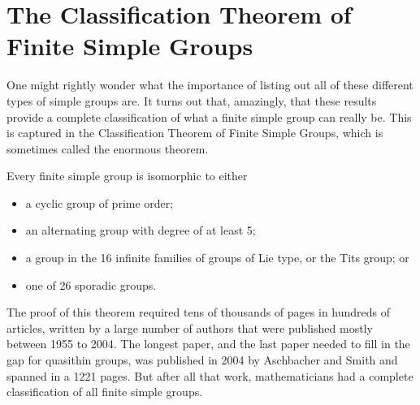 \section{The Classification Theorem of Finite Simple Groups}
One might rightly wonder what the importance of listing out all of these different types of simple groups are. It turns out that, amazingly, that these results provide a complete classification of what a finite simple group can really be. This is captured in the Classification Theorem of Finite Simple Groups, which is sometimes called the enormous theorem.

\begin{theorem}
    Every finite simple group is isomorphic to either
    \begin{itemize}
        \item a cyclic group of prime order;
        \item an alternating group with degree of at least 5;
        \item a group in the 16 infinite families of groups of Lie type, or the Tits group; or
        \item one of 26 sporadic groups.
    \end{itemize}
\end{theorem}

The proof of this theorem required tens of thousands of pages in hundreds of articles, written by a large number of authors that were  published mostly between 1955 to 2004. The longest paper, and the last paper needed to fill in the gap for quasithin groups, was published in 2004 by Aschbacher and Smith and spanned in a 1221 pages. But after all that work, mathematicians had a complete classification of all finite simple groups.
